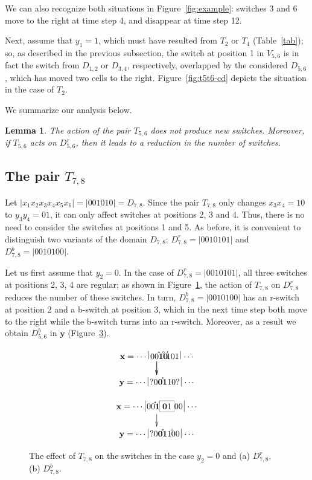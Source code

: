 \documentclass{sn-jnl}
\newtheorem{lem}{Lemma}%
\newcommand{\lllp}{\vline}
\newcommand{\bx}{\mathbf{x}}
\newcommand{\by}{\mathbf{y}}
\newcommand{\gn}[1]{\!^{{}^{{#1}}}\!\!}
\begin{document}
We can also recognize both situations in Figure~\ref{fig:example}: switches 3 and 6 move to the right at time step 4, 
and disappear at time step 12.

Next, assume that $y_1=1$, which must have resulted from $T_2$ or $T_4$ (Table~\ref{tab}); so, as described in the previous subsection, the switch at position 1 in $V_{5,6}$ is in fact the switch from $D_{1,2}$ or $D_{3,4}$, respectively, overlapped by the considered $D_{5,6}$, which has moved two cells to the right. Figure~\ref{fig:t5t6-cd} depicts the situation in the case of $T_2$.

We summarize our analysis below.

\begin{lem}\label{lem:t5t6}
The action of the pair $T_{5,6}$ does not produce new switches. Moreover, if $T_{5,6}$ acts on $D_{5,6}^r$, then it leads to a reduction in the number of switches.
\end{lem}

\subsection{The pair $T_{7,8}$} 

Let $|x_1x_{2}x_{3}x_{4}x_5x_6|=|001010|=D_{7,8}$. Since the pair $T_{7,8}$ only changes $x_{3}x_{4}=10$ to $y_{3}y_{4}=01$, it can only affect switches at positions 2, 3 and 4. Thus, there is no need to consider the switches at positions 1 and 5.
As before, it is convenient to distinguish two variants of the domain $D_{7,8}$: $D_{7,8}^r=|0010101|$ and $D_{7,8}^b=|0010100|$.

Let us first assume that $y_2=0$. In the case of $D_{7,8}^r=|0010101|$, all three switches at positions 2, 3, 4 are regular; as shown in Figure~\ref{fig:t7t8(a)}, the action of $T_{7,8}$ on $D_{7,8}^r$ reduces the number of these switches. In turn, $D_{7,8}^b=|0010100|$ has an r-switch at position 2 and a b-switch at position 3, which in the next time step both move to the right while the b-switch turns into an r-switch. Moreover, as a result we obtain $D_{5,6}^b$ in $\by$ (Figure~\ref{fig:t7t8(b)}).
\begin{figure}[h!b]
    \centering
    \begin{subfigure}{0.45\textwidth}
{\scriptsize\[
\xymatrix@C=0.2cm@R=0.5cm{ 
\bx = \cdots \;\lllp 00\gn{*}\boldsymbol{1}\gn{\circ}\boldsymbol{0}\gn{\prime} \ar[d]  101\,\lllp\,\cdots\ar[d]  \\
\by = \cdots \;\lllp{?}0\boldsymbol{0}\gn{*}\boldsymbol{1}10{?}\,  \lllp\,\cdots   
}
\]}
    \caption{}
    \label{fig:t7t8(a)}
\end{subfigure}
\hfill
 \begin{subfigure}{0.45\textwidth}
{\scriptsize\[
\xymatrix@C=0.2cm@R=0.5cm{ 
\bx = \cdots \;\lllp  00\gn{*}\boldsymbol{1}\gn{\circ} \fcolorbox{gray}{white}{{\bf{0}}1} 00\,\lllp\,\cdots \ar[d]   \\
\by = \cdots \;\lllp{?}0\boldsymbol{0}\gn{*}\boldsymbol{1}1\gn{\circ}00  \,\lllp\,\cdots  
}
\]}
    \caption{}
    \label{fig:t7t8(b)}
\end{subfigure}
\caption{The effect of $T_{7,8}$ on the switches in the case $y_2=0$ and (a) $D_{7,8}^r$, (b) $D_{7,8}^b$.}
\end{figure}
\end{document}
